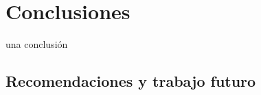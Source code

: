 
\chapter{Conclusiones}

una conclusi\'on
\cite{AR17}

\section{Recomendaciones y trabajo futuro}

%



\endinput 